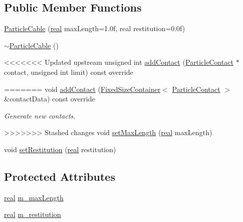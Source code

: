 \subsection*{Public Member Functions}
\begin{DoxyCompactItemize}
\item 
\mbox{\hyperlink{classr3_1_1_particle_cable_afcb568750f7430ec94e34942f766e087}{Particle\+Cable}} (\mbox{\hyperlink{namespacer3_ab2016b3e3f743fb735afce242f0dc1eb}{real}} max\+Length=1.\+0f, real restitution=0.\+0f)
\item 
\mbox{\hyperlink{classr3_1_1_particle_cable_a4ba107749641635a5d7b670eab78c371}{$\sim$\+Particle\+Cable}} ()
\item 
<<<<<<< Updated upstream
unsigned int \mbox{\hyperlink{classr3_1_1_particle_cable_af8024236316ae2cf7bd68a0e906ed7c7}{add\+Contact}} (\mbox{\hyperlink{classr3_1_1_particle_contact}{Particle\+Contact}} $\ast$contact, unsigned int limit) const override
\item 
=======
void \mbox{\hyperlink{classr3_1_1_particle_cable_a5187ee9d99fb41cf6e719c22c9b30a7c}{add\+Contact}} (\mbox{\hyperlink{classr3_1_1_fixed_size_container}{Fixed\+Size\+Container}}$<$ \mbox{\hyperlink{classr3_1_1_particle_contact}{Particle\+Contact}} $>$ \&contact\+Data) const override
\begin{DoxyCompactList}\small\item\em Generate new contacts. \end{DoxyCompactList}\item 
>>>>>>> Stashed changes
void \mbox{\hyperlink{classr3_1_1_particle_cable_a6cf3d6cff00fa5a7eeb1df8975cd59de}{set\+Max\+Length}} (\mbox{\hyperlink{namespacer3_ab2016b3e3f743fb735afce242f0dc1eb}{real}} max\+Length)
\item 
void \mbox{\hyperlink{classr3_1_1_particle_cable_a070f8df68fbf2b7a7b758f1c5b22c42c}{set\+Restitution}} (\mbox{\hyperlink{namespacer3_ab2016b3e3f743fb735afce242f0dc1eb}{real}} restitution)
\end{DoxyCompactItemize}
\subsection*{Protected Attributes}
\begin{DoxyCompactItemize}
\item 
\mbox{\hyperlink{namespacer3_ab2016b3e3f743fb735afce242f0dc1eb}{real}} \mbox{\hyperlink{classr3_1_1_particle_cable_a168d7ed5047dc94ae73f7eec4929ab4d}{m\+\_\+max\+Length}}
\item 
\mbox{\hyperlink{namespacer3_ab2016b3e3f743fb735afce242f0dc1eb}{real}} \mbox{\hyperlink{classr3_1_1_particle_cable_ad03466bf1aeecddec5fd0319be7b2e3d}{m\+\_\+restitution}}
\end{DoxyCompactItemize}
